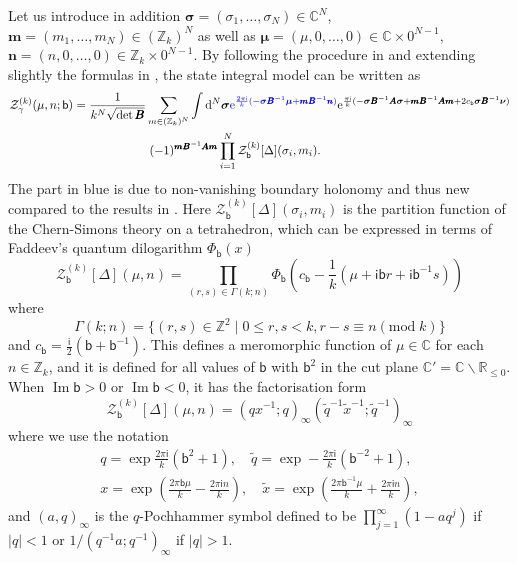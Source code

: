 \documentclass[a4paper,11pt]{article}	%
\DeclareMathOperator{\imag}{Im}
\def\mc{\mathcal}
\def\ms{\mathsf}
\newcommand{\bs}[1]{\boldsymbol{#1}}
\def\IC{\mathbb{C}}
\def\IR{\mathbb{R}}
\def\IZ{\mathbb{Z}}
\def\tq{\tilde{q}}
\def\tx{\tilde{x}}
\newcommand{\re}{{\rm e}}
\newcommand{\ri}{{\mathsf{i}}}
\newcommand{\rd}{{\rm d}}
\newcommand{\nn}{\nonumber \\}
\newcommand{\bb}{\ms{b}}
\newcommand{\s}{\sigma}
\def\jjj#1{$\spadesuit\spadesuit$ \emph{\textcolor{red}{#1}}
  $\spadesuit\spadesuit$}
\begin{document}
Let us introduce in addition
$\bs{\sigma} = (\s_1,\ldots,\s_N) \in \IC^N$,
$\pmb{m} = (m_1,\ldots,m_N)\in(\IZ_k)^N$ as well as
$\bs{\mu} = (\mu,0,\ldots,0) \in \IC\times 0^{N-1}$,
$\pmb{n} = (n,0,\ldots,0) \in \IZ_k\times 0^{N-1}$.
%
By following the procedure in \cite{Dimofte:2014zga} and extending
slightly the formulas in \cite{Dimofte:2015kkp}, the state integral
model can be written as %
\begin{align}
  &\mc{Z}_\gamma^{(k)}(\mu,n;\bb)  =
    \frac{%
    1
    }{k^N\sqrt{\det \pmb{B}}}
    \sum_{m\in (\IZ_k)^N}\int
    \rd^N \bs\sigma
    \textcolor{blue}{\re^{\frac{2\pi\ri}{k}(-\bs\sigma \pmb{B}^{-1}\bs\mu+\pmb{m} \pmb{B}^{-1}\pmb{n})}}
    \re^{\frac{\pi\ri}{k}(-\bs\sigma \pmb{B}^{-1}\pmb{A}\bs\sigma +
    \pmb{m} \pmb{B}^{-1}\pmb{A} \pmb{m} + 2 c_\bb\bs{\sigma}
    \pmb{B}^{-1}\bs{\nu})}\nn 
  &\phantom{===============}      
    (-1)^{\pmb{m} \pmb{B}^{-1}\pmb{A} \pmb{m}}
    \prod_{i=1}^N \mc{Z}_\bb^{(k)}[\Delta](\sigma_i,m_i).
      \label{eq:ZNgmMu0}
\end{align}
The part in blue is due to non-vanishing boundary holonomy and thus
new compared to the results in \cite{Dimofte:2015kkp}. Here
$\mc{Z}_\bb^{(k)}[\Delta](\sigma_i,m_i)$ is the partition function of
the Chern-Simons theory on a tetrahedron, which can be expressed in
terms of Faddeev's quantum dilogarithm $\Phi_\bb(x)$
\begin{equation}
  \mc{Z}_\bb^{(k)}[\Delta](\mu,n) =
  \prod_{(r,s)\in \Gamma(k;n)}\Phi_\bb(c_\bb
  -\frac{1}{k}(\mu+\ri \bb r + \ri\bb^{-1}s))
\end{equation}
where
\begin{equation}
  \Gamma(k;n) = \{(r,s)\in\IZ^2\;|\; 0\leq r,s<k, r-s \equiv n
  (\text{mod}\;k)\}
\end{equation}
and $c_\bb = \frac{\ri}{2}(\bb+\bb^{-1})$.  This defines a meromorphic
function of $\mu\in\IC$ for each $n\in\IZ_k$, and it is defined for
all values of $\bb$ with $\bb^2$ in the cut plane
$\IC' = \IC\backslash \IR_{\leq 0}$.
When $\imag \bb >0$ or $\imag\bb <0$, it has the factorisation form
\begin{equation}
  \mc{Z}_{\bb}^{(k)}[\Delta](\mu,n) = (qx^{-1};q)_\infty (\tq^{-1}\tx^{-1};\tq^{-1})_\infty
\end{equation}
where we use the notation
\begin{equation}
  \begin{gathered}
    q = \exp \frac{2\pi\ri}{k}(\bb^2+1),\quad \tq = \exp
    -\frac{2\pi\ri}{k}(\bb^{-2}+1),\\
    x = \exp \left(\frac{2\pi\bb\mu}{k} - \frac{2\pi\ri n}{k}\right),\quad
    \tx = \exp \left(\frac{2\pi\bb^{-1}\mu}{k} + \frac{2\pi\ri n}{k}\right),
  \end{gathered}
\end{equation}
and $(a,q)_\infty$ is the $q$-Pochhammer symbol defined to be
$\prod_{j=1}^\infty(1-a q^j)$ if $|q|<1$ or
$1/(q^{-1}a;q^{-1})_\infty$ if $|q|>1$.
\end{document}
